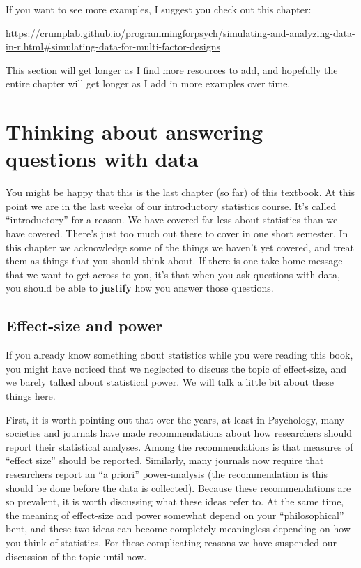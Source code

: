 \documentclass[
]{book}
\begin{document}
If you want to see more examples, I suggest you check out this chapter:

\url{https://crumplab.github.io/programmingforpsych/simulating-and-analyzing-data-in-r.html\#simulating-data-for-multi-factor-designs}

This section will get longer as I find more resources to add, and hopefully the entire chapter will get longer as I add in more examples over time.

\hypertarget{thinking-about-answering-questions-with-data}{%
\chapter{Thinking about answering questions with data}\label{thinking-about-answering-questions-with-data}}

You might be happy that this is the last chapter (so far) of this textbook. At this point we are in the last weeks of our introductory statistics course. It's called ``introductory'' for a reason. We have covered far less about statistics than we have covered. There's just too much out there to cover in one short semester. In this chapter we acknowledge some of the things we haven't yet covered, and treat them as things that you should think about. If there is one take home message that we want to get across to you, it's that when you ask questions with data, you should be able to \textbf{justify} how you answer those questions.

\hypertarget{effect-size-and-power}{%
\section{Effect-size and power}\label{effect-size-and-power}}

If you already know something about statistics while you were reading this book, you might have noticed that we neglected to discuss the topic of effect-size, and we barely talked about statistical power. We will talk a little bit about these things here.

First, it is worth pointing out that over the years, at least in Psychology, many societies and journals have made recommendations about how researchers should report their statistical analyses. Among the recommendations is that measures of ``effect size'' should be reported. Similarly, many journals now require that researchers report an ``a priori'' power-analysis (the recommendation is this should be done before the data is collected). Because these recommendations are so prevalent, it is worth discussing what these ideas refer to. At the same time, the meaning of effect-size and power somewhat depend on your ``philosophical'' bent, and these two ideas can become completely meaningless depending on how you think of statistics. For these complicating reasons we have suspended our discussion of the topic until now.
\end{document}
